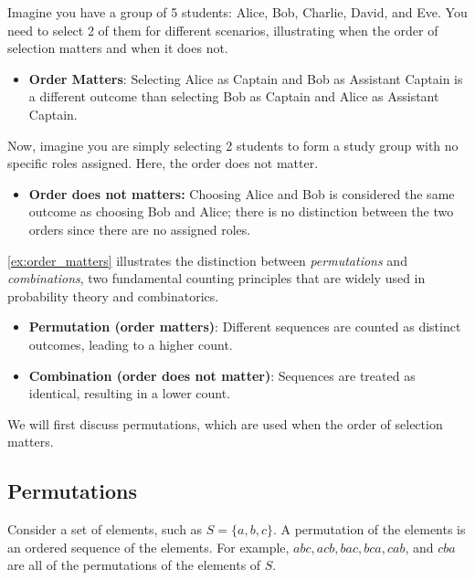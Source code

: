 \begin{example}
    Imagine you have a group of 5 students: Alice, Bob, Charlie, David, and Eve. You need to select 2 of them for different scenarios, illustrating when the order of selection matters and when it does not.
    \begin{itemize}
        \item \textbf{Order Matters}: Selecting Alice as Captain and Bob as Assistant Captain is a different outcome than selecting Bob as Captain and Alice as Assistant Captain.
        \end{itemize}
    Now, imagine you are simply selecting 2 students to form a study group with no specific roles assigned. Here, the order does not matter.
    \begin{itemize}
        \item \textbf{Order does not matters:}  Choosing Alice and Bob is considered the same outcome as choosing Bob and Alice; there is no distinction between the two orders since there are no assigned roles.
    \end{itemize}
    \label{ex:order_matters}
\end{example}

\autoref{ex:order_matters} illustrates the distinction between \textit{permutations} and \textit{combinations}, two fundamental counting principles that are widely used in probability theory and combinatorics.

\begin{definition}
    \begin{itemize}
        \item \textbf{Permutation (order matters)}: Different sequences are counted as distinct outcomes, leading to a higher count.
        \item \textbf{Combination (order does not matter)}: Sequences are treated as identical, resulting in a lower count.
    \end{itemize}
\end{definition}

We will first discuss permutations, which are used when the order of selection matters.

\subsection*{Permutations}

Consider a set of elements, such as $S=\{a, b, c\}$. A permutation of the elements is an ordered sequence of the elements. For example, $a b c, a c b, b a c, b c a, c a b$, and $c b a$ are all of the permutations of the elements of $S$.

